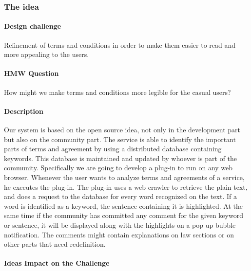 \subsubsection{The idea}

\paragraph{Design challenge} 

Refinement of terms and conditions in order to 
make them easier to read and more appealing to the users.

\paragraph{HMW Question} 

How might we make terms and conditions more legible 
for the casual users?

\paragraph{Description}

Our system is based on the  open source idea, not only in the development part 
but also on the community part. The service is able to identify the important 
parts of terms and agreement by using a distributed database containing keywords.
This database is maintained and updated by whoever is part of the community. 
Specifically we are going to develop a plug-in to run on any web browser.
Whenever the user wants to analyze terms and agreements of a service, he 
executes the plug-in. The plug-in uses a web crawler to retrieve the plain text, 
and does a request to the database for every word recognized on the text. If a 
word is identified as a keyword, the sentence containing it is highlighted. At 
the same time if the community has committed any comment for the given keyword 
or sentence, it will be displayed along with the highlights on a pop up bubble 
notification.
The comments might contain explanations on law sections or on other parts that 
need redefinition.

\paragraph{Ideas Impact on the Challenge}

